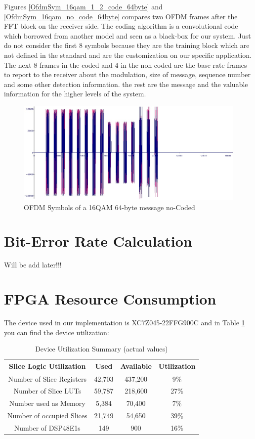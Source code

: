 Figures \ref{OfdmSym_16qam_1_2_code_64byte} and \ref{OfdmSym_16qam_no_code_64byte} compares two OFDM frames after the FFT block on the receiver side. The coding algorithm is a convolutional code which borrowed from another model and seen as a black-box for our system. Just do not consider the first 8 symbols because they are the training block which are not defined in the standard and are the customization on our specific application. The next 8 frames in the coded and 4 in the non-coded are the base rate frames to report to the receiver about the modulation, size of message, sequence number and some other detection information. the rest are the message and the valuable information for the higher levels of the system.\\

\begin{figure}
\centering
\includegraphics[width=\textwidth]{content/fig/OfdmSym_16qam_no_code_64byte.JPG}
\caption{OFDM Symbols of a 16QAM 64-byte message no-Coded}
\label{fig:OfdmSym_16qam_no_code_64byte}
\end{figure}

\section{Bit-Error Rate Calculation}
Will be add later!!!


\section{FPGA Resource Consumption}
The device used in our implementation is  XC7Z045-22FFG900C and in Table \ref{table:DevUtil} you can find the device utilization:\\


\begin{table}
\centering
\vspace{0.5cm}
\begin{tabular}{c|c|c|c}
Slice Logic Utilization&Used&Available&Utilization\\ \hline
Number of Slice Registers&42,703&437,200&9\% \\
Number of Slice LUTs&59,787&218,600&27\% \\
Number used as Memory&5,384&70,400&7\% \\
Number of occupied Slices&21,749&54,650&39\% \\
Number of DSP48E1s&149&900&16\% \\
\end{tabular}

\caption{Device Utilization Summary (actual values)}
\label{table:DevUtil}
\end{table}

